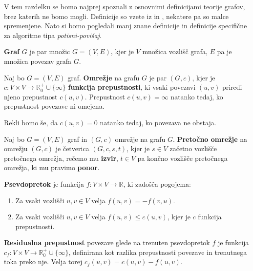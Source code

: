 \documentclass[mat1]{fmfdelo}
\begin{document}
V tem razdelku se bomo najprej spoznali z osnovnimi definicijami teorije grafov, brez katerih ne bomo mogli. Definicije so vzete iz \cite{clrs} in \cite{uvtg}, nekatere pa so malce spremenjene. Nato si bomo pogledali manj znane definicije in definicije specifične za algoritme tipa \textit{potisni-povišaj}.

\begin{definicija}
\textbf{Graf} $G$ je par množic $G = (V,E)$, kjer je $V$ množica vozlišč grafa, $E$ pa je množica povezav grafa $G$.
\end{definicija}

\begin{definicija}\label{def:omrezjeprepustnost}
Naj bo $G = (V, E)$ graf. \textbf{Omrežje} na grafu $G$ je par $(G, c)$, kjer je $c \colon V \times V \rightarrow \mathbb{R}^+_0 \cup \{\infty\}$ \textbf{funkcija prepustnosti}, ki vsaki povezavi $(u,v)$ priredi njeno prepustnost $c(u,v)$. Prepustnost $c(u,v) = \infty$ natanko tedaj, ko prepustnost povezave ni omejena.

Rekli bomo še, da $c(u,v)=0$ natanko tedaj, ko povezava ne obstaja.
\end{definicija}

\begin{definicija}
Naj bo $G = (V,E)$ graf in $(G,c)$ omrežje na grafu $G$. \textbf{Pretočno omrežje} na omrežju $(G,c)$ je četverica $(G,c,s,t)$, kjer je $s\in V$ začetno vozlišče pretočnega omrežja, rečemo mu \textbf{izvir}, $t\in V$ pa končno vozlišče pretočnega omrežja, ki mu pravimo \textbf{ponor}.
\end{definicija}

\begin{definicija} \label{def:psevdopretok}
\textbf{Psevdopretok} je funkcija $f \colon V \times V \rightarrow \mathbb{R}$, ki zadošča pogojema:
\begin{enumerate}
\item Za vsaki vozlišči $u,v \in V$ velja $f(u,v) = - f(v,u)$.
\item Za vsaki vozlišči $u,v \in V$ velja $f(u,v) \leq c(u,v)$, kjer je $c$ funkcija prepustnosti.
\end{enumerate}
\end{definicija}

\begin{definicija}\label{def:resprepustnost}
\textbf{Residualna prepustnost} povezave glede na trenuten psevdopretok $f$ je funkcija $c_f \colon V \times V \rightarrow \mathbb{R}^+_0 \cup \{\infty\}$, definirana kot razlika prepustnosti povezave in trenutnega toka preko nje. Velja torej $c_f(u,v) = c(u,v) - f(u,v)$.
\end{definicija}
\end{document}
